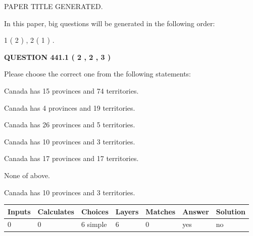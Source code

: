 \documentclass[12pt]{article}
\begin{document}
   
\vspace{0.2in}
   
   
   
   
   
   
   
   
 \vspace{0.2in}
 
 
 
 
   
   
 PAPER TITLE GENERATED.
   
   
   
\vspace{0.2in}
   
In this paper, big questions will be generated in the following order: 
   
   
   1 ( 2 )
 ,
   2 ( 1 )
 .
  
\vspace{0.2in}
  
{\textbf{\Large{QUESTION
441.1 
 ( 2 , 2 , 3 )
}}}
  
  
Please choose the correct one from the following statements:
 
 
Canada has  15 provinces and  74 territories.
 
 
Canada has   4 provinces and  19 territories.
 
 
Canada has  26 provinces and  5 territories.
 
 
Canada has 10  provinces and 3 territories.
 
 
Canada has  17 provinces and  17 territories.
 
 
 None of above.
 
 
\noindent{}
 
 
Canada has 10  provinces and 3 territories.
 
 
\noindent{}
 
 
   
   
   
   
\noindent\begin{tabular}{|l|l|l|l|l|l|l|}
 \hline
Inputs & Calculates & Choices & Layers & Matches & Answer & Solution \\ \hline
 0  & 
 0  & 
 6
  simple  
  & 
 6  & 
 0  & 
  yes & 
  no 
  \\ \hline
 \end{tabular}
   
\end{document}
